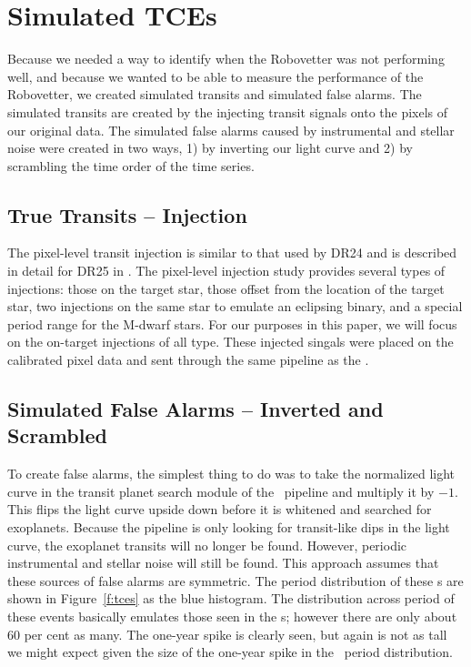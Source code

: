 \section{Simulated TCEs}

Because we needed a way to identify when the Robovetter was not performing well, and because we wanted to be able to measure the performance of the Robovetter, we created simulated transits and simulated false alarms. The simulated transits are created by the injecting transit signals onto the pixels of our original data.  The simulated false alarms caused by instrumental and stellar noise were created in two ways, 1) by inverting our light curve and 2) by scrambling the time order of the time series.  


\subsection{True Transits -- Injection}
\label{injectsec}
The pixel-level transit injection is similar to that used by DR24 \citep{Christiansen2016} and is described in detail for DR25 in \citep{Christiansen2017}. The pixel-level injection study provides several types of injections: those on the target star, those offset from the location of the target star, two injections on the same star to emulate an eclipsing binary, and a special period range for the M-dwarf stars.  For our purposes in this paper, we will focus on the on-target injections of all type.  These injected singals were placed on the calibrated pixel data and sent through the same \Kepler{} pipeline as the \obstces.


\subsection{Simulated False Alarms -- Inverted and Scrambled} 

To create false alarms, the simplest thing to do was to take the normalized light curve in the transit planet search module of the \Kepler\ pipeline and multiply it by $-1$.  This flips the light curve upside down before it is whitened and searched for exoplanets.  Because the pipeline is only looking for transit-like dips in the light curve, the exoplanet transits will no longer be found. However, periodic instrumental and stellar noise will still be found.  This approach assumes that these sources of false alarms are symmetric. The period distribution of these \invtce s are shown in Figure~\ref{f:tces} as the blue histogram.  The distribution across period of these events basically emulates those seen in the \opstce s; however there are only about 60 per cent as many.  The one-year spike is clearly seen, but again is not as tall we might expect given the size of the one-year spike in the \opstce\ period distribution. 


